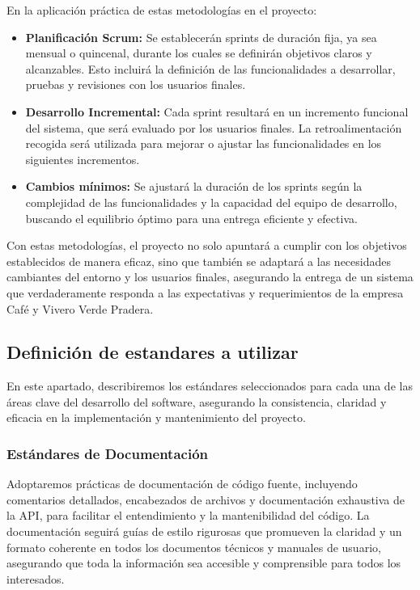 En la aplicación práctica de estas metodologías en el proyecto:
\begin{itemize}
	\item \textbf{Planificación Scrum:} Se establecerán sprints de duración fija,
	      ya sea mensual o quincenal, durante los cuales se definirán objetivos
	      claros y alcanzables. Esto incluirá la definición de las funcionalidades
	      a desarrollar, pruebas y revisiones con los usuarios finales.
	\item \textbf{Desarrollo Incremental:} Cada sprint resultará en un
	      incremento funcional del sistema, que será evaluado por los usuarios finales.
	      La retroalimentación recogida será utilizada para mejorar o ajustar las
	      funcionalidades en los siguientes incrementos.
	\item \textbf{Cambios mínimos:} Se ajustará la duración de los sprints según
	      la complejidad de las funcionalidades y la capacidad del equipo de desarrollo,
	      buscando el equilibrio óptimo para una entrega eficiente y efectiva.
\end{itemize}





Con estas metodologías, el proyecto no solo apuntará a cumplir con los objetivos establecidos de manera eficaz, sino que también se adaptará a las necesidades cambiantes del entorno y los usuarios finales, asegurando la entrega de un sistema que verdaderamente responda a las expectativas y requerimientos de la empresa Café y Vivero Verde Pradera.

\subsection{Definición de estandares a utilizar}

En este apartado, describiremos los estándares seleccionados para cada una 
de las áreas clave del desarrollo del software, asegurando la consistencia, 
claridad y eficacia en la implementación y mantenimiento del proyecto.

\subsubsection*{\textbf{Estándares de Documentación}}

Adoptaremos prácticas de documentación de código fuente, incluyendo comentarios detallados, 
encabezados de archivos y documentación exhaustiva de la API, para facilitar el entendimiento 
y la mantenibilidad del código. La documentación seguirá guías de estilo rigurosas que promueven
la claridad y un formato coherente en todos los documentos técnicos y manuales de usuario, 
asegurando que toda la información sea accesible y comprensible para todos los interesados.

